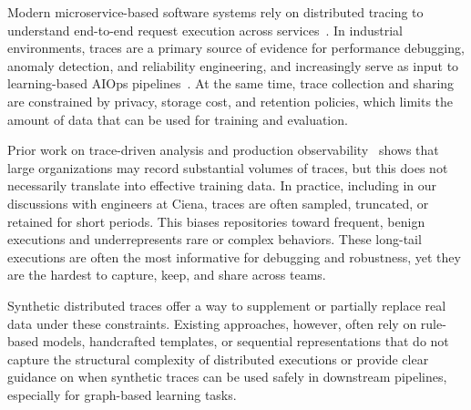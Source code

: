 \documentclass[sigconf,review]{acmart}
\begin{document}
Modern microservice-based software systems rely on distributed tracing to understand end-to-end request execution across services~\cite{li2022enjoy}. In industrial environments, traces are a primary source of evidence for performance debugging, anomaly detection, and reliability engineering, and increasingly serve as input to learning-based AIOps pipelines~\cite{sambasivan2013diagnosing}. At the same time, trace collection and sharing are constrained by privacy, storage cost, and retention policies, which limits the amount of data that can be used for training and evaluation.

Prior work on trace-driven analysis and production observability~\cite{9019687,alzubaidi2023survey} shows that large organizations may record substantial volumes of traces, but this does not necessarily translate into effective training data. In practice, including in our discussions with engineers at Ciena, traces are often sampled, truncated, or retained for short periods. This biases repositories toward frequent, benign executions and underrepresents rare or complex behaviors. These long-tail executions are often the most informative for debugging and robustness, yet they are the hardest to capture, keep, and share across teams.


Synthetic distributed traces offer a way to supplement or partially replace real data under these constraints. Existing approaches, however, often rely on rule-based models, handcrafted templates, or sequential representations that do not capture the structural complexity of distributed executions or provide clear guidance on when synthetic traces can be used safely in downstream pipelines, especially for graph-based learning tasks.
\end{document}
